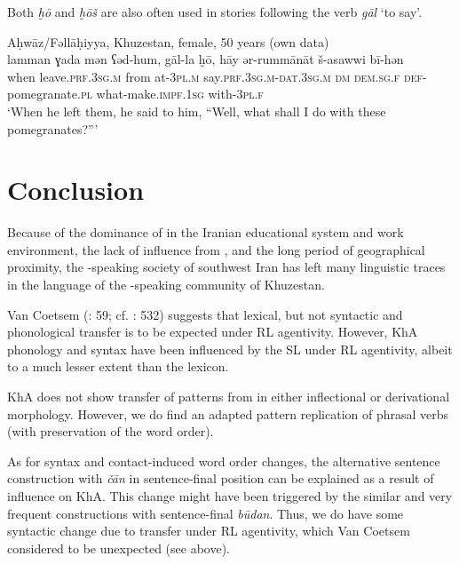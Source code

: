 \documentclass[output=paper,nonflat]{langsci/langscibook}
\begin{document}

Both \textit{ḫō} and \textit{ḫōš} are also often used in stories following the verb \textit{gāl} ‘to say’.

\ea
{Aḥwāz/Fəllāḥiyya, Khuzestan, female, 50 years (own data)}\\
\gll lamman ɣada mən ʕəd-hum, gāl-la ḫō, hāy ər-rummānāt š-asawwi bī-hən\\
     when leave.\textsc{prf}.\textsc{3sg.m} from at-\textsc{3pl.m} say.\textsc{prf}.\textsc{3sg.m}-\textsc{dat.3sg.m} \textsc{dm} \textsc{dem}.\textsc{sg}.\textsc{f} \textsc{def}-pomegranate.\textsc{pl} what-make.\textsc{impf}.\textsc{1sg} with-\textsc{3pl.f}\\
\glt ‘When he left them, he said to him, ``Well, what shall I do with these pomegranates?”’
\z

\section{Conclusion}

Because of the dominance of  in the Iranian educational system and work environment, the lack of influence from  , and the long period of geographical proximity, the -speaking society of southwest Iran has left many linguistic traces in the language of the -speaking community of Khuzestan. 

Van Coetsem (\citeyear{VanCoetsem2000}: 59; cf. \citealt{Lucas2015}: 532) suggests that lexical, but not syntactic and phonological {transfer} is to be expected under {RL} agentivity. However, KhA phonology and syntax have been influenced by the {SL}  under {RL} agentivity, albeit to a much lesser extent than the lexicon.

KhA does not show {transfer} of patterns from  in either {inflectional} or {derivational} morphology. However, we do find an adapted pattern {replication} of  phrasal verbs (with preservation of the  {word order}). 

As for syntax and contact-induced {word order} changes, the alternative sentence construction with \textit{čān} in sentence-final position can be explained as a result of  influence on KhA. This change might have been triggered by the similar and very frequent  constructions with sentence-final \textit{būdan}. Thus, we do have some syntactic change due to {transfer} under {RL} agentivity, which Van Coetsem considered to be unexpected (see above).
\end{document}
